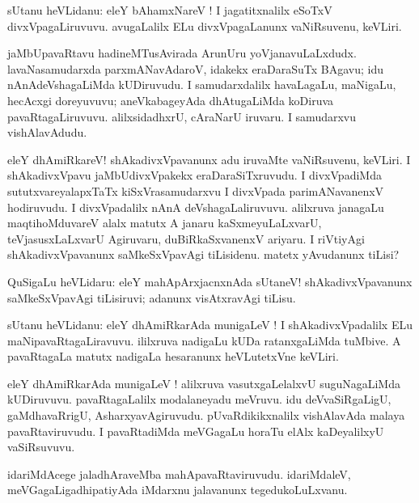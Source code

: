 \documentclass{article}
\begin{document}
\begin{mn}
sUtanu heVLidanu: eleY bAhamxNareV ! I  jagatitxnalilx eSoTxV divxVpagaLiruvuvu.
avugaLalilx ELu divxVpagaLanunx vaNiRsuvenu, keVLiri.
\end{mn}

\begin{mn}
jaMbUpavaRtavu hadineMTusAvirada ArunUru yoVjanavuLaLxdudx. lavaNasamudarxda parxmANavAdaroV,
idakekx eraDaraSuTx BAgavu; idu nAnAdeVshagaLiMda kUDiruvudu. I samudarxdalilx havaLagaLu,
maNigaLu, hecAcxgi doreyuvuvu; aneVkabageyAda dhAtugaLiMda koDiruva pavaRtagaLiruvuvu. 
alilxsidadhxrU, cAraNarU iruvaru. I samudarxvu vishAlavAdudu.
\end{mn}

\begin{mn}
eleY dhAmiRkareV! shAkadivxVpavanunx adu iruvaMte vaNiRsuvenu, keVLiri. 
I shAkadivxVpavu jaMbUdivxVpakekx eraDaraSiTxruvudu. I divxVpadiMda sututxvareyalapxTaTx
kiSxVrasamudarxvu I divxVpada parimANavanenxV hodiruvudu. I divxVpadalilx
nAnA deVshagaLaliruvuvu. alilxruva janagaLu maqtihoMduvareV alalx matutx
A janaru kaSxmeyuLaLxvarU, teVjasusxLaLxvarU Agiruvaru, duBiRkaSxvanenxV ariyaru.
I riVtiyAgi shAkadivxVpavanunx saMkeSxVpavAgi tiLisidenu. matetx yAvudanunx tiLisi?
\end{mn}

\begin{mn}
QuSigaLu heVLidaru: eleY mahApArxjacnxnAda sUtaneV! shAkadivxVpavanunx saMkeSxVpavAgi
tiLisiruvi; adanunx visAtxravAgi tiLisu.
\end{mn}

\begin{mn}
sUtanu heVLidanu: eleY dhAmiRkarAda munigaLeV ! I shAkadivxVpadalilx ELu maNipavaRtagaLiravuvu.
ililxruva nadigaLu kUDa ratanxgaLiMda tuMbive. A pavaRtagaLa matutx 
nadigaLa hesaranunx heVLutetxVne keVLiri.
\end{mn}

\begin{mn}
eleY dhAmiRkarAda munigaLeV ! alilxruva vasutxgaLelalxvU suguNagaLiMda kUDiruvuvu.
pavaRtagaLalilx modalaneyadu meVruvu. idu deVvaSiRgaLigU, gaMdhavaRrigU, AsharxyavAgiruvudu.
pUvaRdikikxnalilx vishAlavAda malaya pavaRtaviruvudu. I pavaRtadiMda meVGagaLu 
horaTu elAlx kaDeyalilxyU vaSiRsuvuvu.
\end{mn}

\begin{mn}
idariMdAcege jaladhAraveMba mahApavaRtaviruvudu. idariMdaleV, meVGagaLigadhipatiyAda iMdarxnu 
jalavanunx tegedukoLuLxvanu.
\end{mn}
\end{document}
